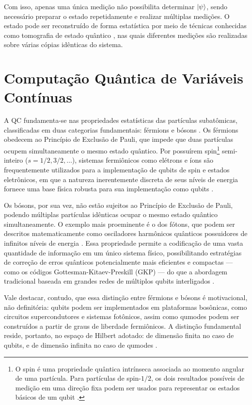 Com isso, apenas uma única medição não possibilita determinar $\ket{\psi}$, sendo necessário preparar o estado repetidamente e realizar múltiplas medições. O estado pode ser reconstruído de forma estatística por meio de técnicas conhecidas como tomografia de estado quântico \cite{james2001measurement}, nas quais diferentes medições são realizadas sobre várias cópias idênticas do sistema.

\section{Computação Quântica de Variáveis Contínuas}\label{subsubsec:cvqc}

A QC fundamenta-se nas propriedades estatísticas das partículas subatômicas, classificadas em duas categorias fundamentais: férmions e bósons \cite{cohen2019quantum}. Os férmions obedecem ao Princípio de Exclusão de Pauli, que impede que duas partículas ocupem simultaneamente o mesmo estado quântico. Por possuírem spin\footnote{O spin é uma propriedade quântica intrínseca associada ao momento angular de uma partícula. Para partículas de spin-$1/2$, os dois resultados possíveis de medição em uma direção fixa podem ser usados para representar os estados básicos de um qubit \cite{nielsen_quantum_2002}.} semi-inteiro ($s = 1/2, 3/2, \dots$), sistemas fermiônicos como elétrons e íons são frequentemente utilizados para a implementação de qubits de spin e estados eletrônicos, em que a natureza inerentemente discreta de seus níveis de energia fornece uma base física robusta para sua implementação como qubits \cite{sakurai2020modern}.

Os bósons, por sua vez, não estão sujeitos ao Princípio de Exclusão de Pauli, podendo múltiplas partículas idênticas ocupar o mesmo estado quântico simultaneamente. O exemplo mais proeminente é o dos fótons, que podem ser descritos matematicamente  como osciladores harmônicos quânticos possuidores de infinitos níveis de energia  \cite{braunstein2005quantum}. Essa propriedade permite a codificação de uma vasta quantidade de informação em um único sistema físico, possibilitando estratégias de correção de erros quânticos potencialmente mais eficientes e compactas — como os códigos Gottesman-Kitaev-Preskill (GKP) — do que a abordagem tradicional baseada em grandes redes de múltiplos qubits interligados \cite{gottesman2000encoding, weedbrook2012gaussian}.

Vale destacar, contudo, que essa distinção entre férmions e bósons é motivacional, não definitória: qubits podem ser implementados em plataformas bosônicas, como circuitos supercondutores e sistemas fotônicos, assim como qumodes podem ser construídos a partir de graus de liberdade fermiônicos. A distinção fundamental reside, portanto, no espaço de Hilbert adotado: de dimensão finita no caso de qubits, e de dimensão infinita no caso de qumodes \cite{weedbrook2012gaussian}.

